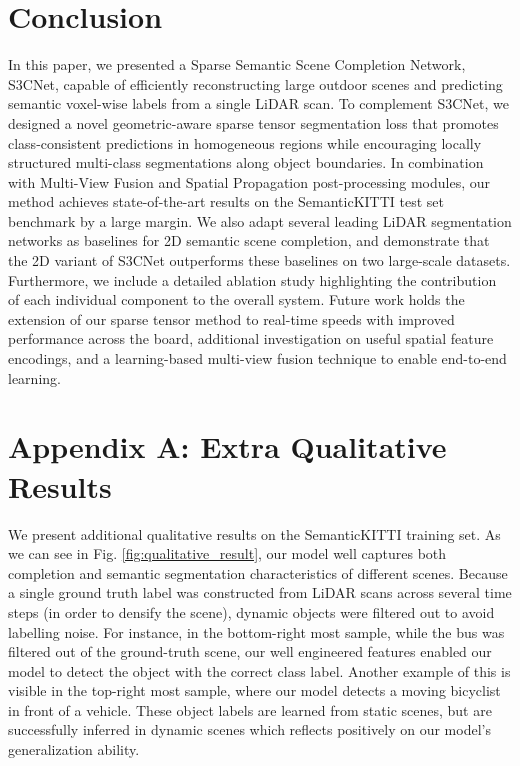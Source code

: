 \documentclass{article}
\begin{document}
\section{Conclusion}
\label{sec:conclusion}





In this paper, we presented a Sparse Semantic Scene Completion Network, S3CNet, capable of efficiently reconstructing large outdoor scenes and predicting semantic voxel-wise labels from a single LiDAR scan. To complement S3CNet, we designed a novel geometric-aware sparse tensor segmentation loss that promotes class-consistent predictions in homogeneous regions while encouraging locally structured multi-class segmentations along object boundaries. In combination with Multi-View Fusion and Spatial Propagation post-processing modules, our method achieves state-of-the-art results on the SemanticKITTI test set benchmark by a large margin. We also adapt several leading LiDAR segmentation networks as baselines for 2D semantic scene completion, and demonstrate that the 2D variant of S3CNet outperforms these baselines on two large-scale datasets. Furthermore, we include a detailed ablation study highlighting the contribution of each individual component to the overall system. Future work holds the extension of our sparse tensor method to real-time speeds with improved performance across the board, additional investigation on useful spatial feature encodings, and a learning-based multi-view fusion technique to enable end-to-end learning.





\clearpage
{}



  

\section{Appendix A: Extra Qualitative Results}





We present additional qualitative results on the SemanticKITTI training set. As we can see in Fig. \ref{fig:qualitative_result}, our model well captures both completion and semantic segmentation characteristics of different scenes. Because a single ground truth label was constructed from LiDAR scans across several time steps (in order to densify the scene), dynamic objects were filtered out to avoid labelling noise. For instance, in the bottom-right most sample, while the bus was filtered out of the ground-truth scene, our well engineered features enabled our model to detect the object with the correct class label. Another example of this is visible in the top-right most sample, where our model detects a moving bicyclist in front of a vehicle. These object labels are learned from static scenes, but are successfully inferred in dynamic scenes which reflects positively on our model's generalization ability.
\end{document}
